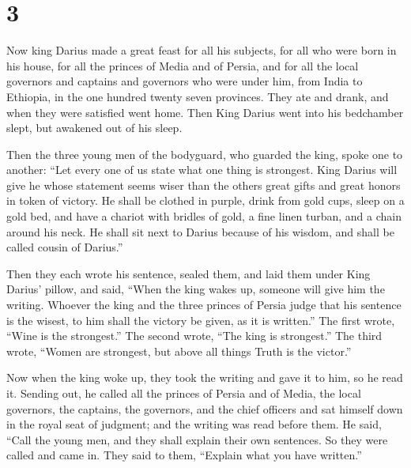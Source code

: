 \hypertarget{section-2}{%
\section{3}\label{section-2}}

 Now king Darius made a great feast for all his subjects,
for all who were born in his house, for all the princes of Media and of
Persia,  and for all the local governors and captains and
governors who were under him, from India to Ethiopia, in the one hundred
twenty seven provinces.  They ate and drank, and when they
were satisfied went home. Then King Darius went into his bedchamber
slept, but awakened out of his sleep.

 Then the three young men of the bodyguard, who guarded
the king, spoke one to another:  ``Let every one of us
state what one thing is strongest. King Darius will give he whose
statement seems wiser than the others great gifts and great honors in
token of victory.  He shall be clothed in purple, drink
from gold cups, sleep on a gold bed, and have a chariot with bridles of
gold, a fine linen turban, and a chain around his neck. 
He shall sit next to Darius because of his wisdom, and shall be called
cousin of Darius.''

 Then they each wrote his sentence, sealed them, and laid
them under King Darius' pillow,  and said, ``When the king
wakes up, someone will give him the writing. Whoever the king and the
three princes of Persia judge that his sentence is the wisest, to him
shall the victory be given, as it is written.''  The
first wrote, ``Wine is the strongest.''  The second
wrote, ``The king is strongest.''  The third wrote,
``Women are strongest, but above all things Truth is the victor.''

 Now when the king woke up, they took the writing and
gave it to him, so he read it.  Sending out, he called
all the princes of Persia and of Media, the local governors, the
captains, the governors, and the chief officers  and sat
himself down in the royal seat of judgment; and the writing was read
before them.  He said, ``Call the young men, and they
shall explain their own sentences. So they were called and came in.
 They said to them, ``Explain what you have written.''

